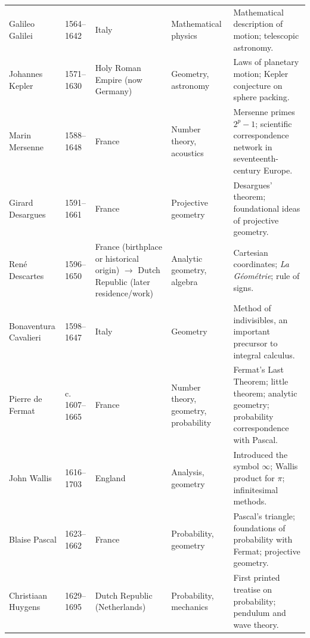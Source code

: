 {\begin{longtable}{@{}L{0.145\textwidth}L{0.09\textwidth}L{0.225\textwidth}L{0.14\textwidth}L{0.30\textwidth}@{}}
        Galileo Galilei
        & 1564--1642
        & Italy
        & Mathematical physics
        & Mathematical description of motion; telescopic astronomy. \\

        Johannes Kepler
        & 1571--1630
        & Holy Roman Empire (now Germany)
        & Geometry, astronomy
        & Laws of planetary motion; Kepler conjecture on sphere packing. \\

        Marin Mersenne
        & 1588--1648
        & France
        & Number theory, acoustics
        & Mersenne primes $2^p-1$; scientific correspondence network in
          seventeenth-century Europe. \\

        Girard Desargues
        & 1591--1661
        & France
        & Projective geometry
        & Desargues' theorem; foundational ideas of projective geometry. \\

        René Descartes
        & 1596--1650
        & France (birthplace or historical origin) \(\to\) Dutch Republic (later residence/work)
        & Analytic geometry, algebra
        & Cartesian coordinates; \textit{La Géométrie}; rule of signs. \\

        Bonaventura Cavalieri
        & 1598--1647
        & Italy
        & Geometry
        & Method of indivisibles, an important precursor to integral calculus. \\

        Pierre de Fermat
        & c. 1607--1665
        & France
        & Number theory, geometry, probability
        & Fermat's Last Theorem; little theorem; analytic geometry; probability
          correspondence with Pascal. \\

        John Wallis
        & 1616--1703
        & England
        & Analysis, geometry
        & Introduced the symbol $\infty$; Wallis product for $\pi$; infinitesimal
          methods. \\

        Blaise Pascal
        & 1623--1662
        & France
        & Probability, geometry
        & Pascal's triangle; foundations of probability with Fermat; projective
          geometry. \\

        Christiaan Huygens
        & 1629--1695
        & Dutch Republic (Netherlands)
        & Probability, mechanics
        & First printed treatise on probability; pendulum and wave theory. \\


\end{longtable}}
